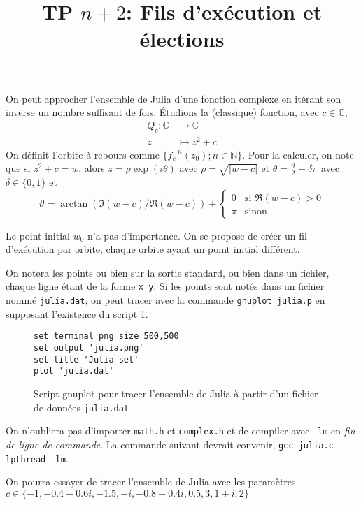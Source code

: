 \documentclass{exam}
\title{TP \( n + 2 \): Fils d'exécution et élections}
\date{}
\newcommand{\Cplx}{\ensuremath{\mathbb{C}}}
\begin{document}
\maketitle
\begin{questions}
On peut approcher l'ensemble de Julia d'une fonction complexe en
itérant son inverse un nombre suffisant de fois. Étudions la
(classique) fonction, avec \( c \in \Cplx \),
\[
  \begin{aligned}
    Q_c : \Cplx &\to \Cplx\\
    z &\mapsto z^2 + c
  \end{aligned}
\]
On définit l'orbite \`a rebours comme
\( \{ f_c^{-n}(z_{0}); n \in \mathbb{N} \} \).  Pour la calculer, on
note que si \( z^2 + c = w \), alors \( z = \rho\exp(i\theta) \) avec
\( \rho = \sqrt{|w - c|} \) et
\( \theta = \frac{\vartheta}{2} + \delta \pi \) avec \( \delta \in \{
0, 1 \} \) et
\[ \vartheta = \arctan(\Im(w - c)/\Re(w - c)) +
  \begin{cases}
    0 & \text{si } \Re(w-c) > 0 \\
    \pi & \text{sinon}
  \end{cases}
\]

Le point initial \( w_0 \) n'a pas d'importance.  On se propose de
créer un fil d'exécution par orbite, chaque orbite ayant un point
initial différent.

On notera les points ou bien sur la sortie standard, ou bien dans un
fichier, chaque ligne étant de la forme \verb|x y|. Si les points sont notés
dans un fichier nommé \verb|julia.dat|, on peut tracer avec la commande
\verb|gnuplot julia.p| en supposant l'existence du script
\cref{fig:gnuplot-julia}.
\begin{figure}[h]
\begin{verbatim}
set terminal png size 500,500
set output 'julia.png'
set title 'Julia set'
plot 'julia.dat'
\end{verbatim}
  \caption{Script gnuplot pour tracer l'ensemble de Julia à partir d'un fichier
    de données \texttt{julia.dat}}\label{fig:gnuplot-julia}
\end{figure}
On n'oubliera pas d'importer \texttt{math.h} et
\texttt{complex.h} et de compiler avec \texttt{-lm} en \emph{fin de
  ligne de commande}. La commande suivant devrait convenir,
\verb|gcc julia.c -lpthread -lm|.

On pourra essayer de tracer l'ensemble de Julia avec les paramètres
\( c \in \{ -1, -0.4 - 0.6i, -1.5, -i, -0.8 + 0.4i, 0.5, 3, 1 + i, 2
\} \)


\end{questions}
\end{document}
